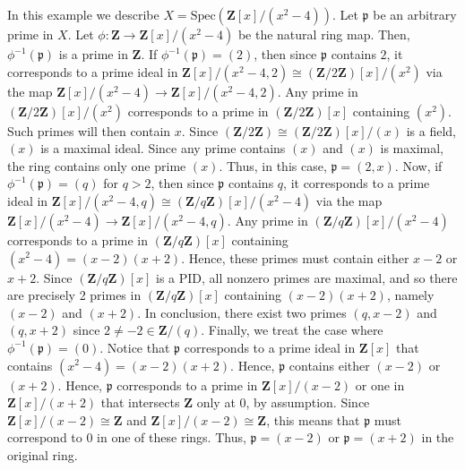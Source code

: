 \begin{example}
\label{example-spec-Zxmodx2minus4}
In this example we describe $X = \text{Spec} (\mathbf{Z}[x]/(x^2 - 4))$.
Let $\mathfrak{p}$ be an arbitrary prime in $X$.
Let $\phi: \mathbf{Z} \to \mathbf{Z}[x]/(x^2 - 4)$ be the natural ring map.
Then, $ \phi^{-1}(\mathfrak p)$ is a prime in $\mathbf{Z}$.
If $ \phi^{-1}(\mathfrak p) = (2)$, then since $\mathfrak p$ contains $2$,
it corresponds to a prime ideal in
$\mathbf{Z}[x]/(x^2 - 4, 2) \cong (\mathbf{Z}/2\mathbf{Z})[x]/(x^2)$
via the map $ \mathbf{Z}[x]/(x^2 - 4) \to  \mathbf{Z}[x]/(x^2 - 4, 2)$.
Any prime in $(\mathbf{Z}/2\mathbf{Z})[x]/(x^2)$ corresponds to a prime
in $(\mathbf{Z}/2\mathbf{Z})[x]$ containing $(x^2)$.  Such primes will
then contain $x$.  Since
$(\mathbf{Z}/2\mathbf{Z}) \cong (\mathbf{Z}/2\mathbf{Z})[x]/(x)$ is a field,
$(x)$ is a maximal ideal.  Since any prime contains $(x)$ and $(x)$ is
maximal, the ring contains only one prime $(x)$.  Thus, in this case,
$\mathfrak p = (2, x)$.  Now, if $ \phi^{-1}(\mathfrak p) = (q)$ for
$q > 2$, then since $\mathfrak p$ contains $q$, it corresponds to a
prime ideal in
$\mathbf{Z}[x]/(x^2 - 4, q) \cong (\mathbf{Z}/q\mathbf{Z})[x]/(x^2 - 4)$
via the map $ \mathbf{Z}[x]/(x^2 - 4) \to  \mathbf{Z}[x]/(x^2 - 4, q)$.
Any prime in $(\mathbf{Z}/q\mathbf{Z})[x]/(x^2 - 4)$ corresponds to a
prime in $(\mathbf{Z}/q\mathbf{Z})[x]$ containing $(x^2 - 4) = (x -2)(x + 2)$.
Hence, these primes must contain either $x -2$ or $x + 2$.  Since
$(\mathbf{Z}/q\mathbf{Z})[x]$ is a PID, all nonzero
primes are maximal, and so there
are precisely 2 primes in $(\mathbf{Z}/q\mathbf{Z})[x]$ containing
$(x-2)(x + 2)$, namely $(x-2)$ and $(x + 2)$.  In conclusion, there exist two
primes $(q, x-2)$ and $(q, x + 2)$ since $2 \neq -2 \in \mathbf{Z}/(q)$.
Finally, we treat the case where $\phi^{-1}(\mathfrak p) = (0)$.  Notice
that $\mathfrak p$ corresponds to a prime ideal in $\mathbf{Z}[x]$ that
contains $(x^2 - 4) = (x -2)(x + 2)$.  Hence, $\mathfrak p$ contains either
$(x-2)$ or $(x + 2)$.  Hence, $\mathfrak p$ corresponds to a prime in
$\mathbf{Z}[x]/(x-2)$ or one in $\mathbf{Z}[x]/(x + 2)$ that intersects
$\mathbf{Z}$ only at $0$, by assumption.  Since
$\mathbf{Z}[x]/(x-2) \cong \mathbf{Z}$ and
$\mathbf{Z}[x]/(x-2) \cong \mathbf{Z}$, this means that $\mathfrak p$
must correspond to $0$ in one of these rings.  Thus,
$\mathfrak p = (x-2)$ or $\mathfrak p = (x + 2)$ in the original ring.
\end{example}


